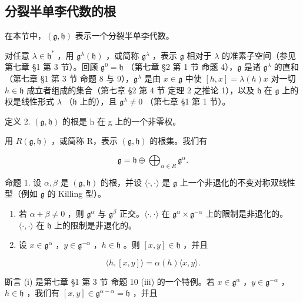 \subsection{分裂半单李代数的根}

在本节中，\((\mathfrak{g},\mathfrak{h})\) 表示一个分裂半单李代数。

对任意 \(\lambda \in \mathfrak{h}^*\) ，用 \(\mathfrak{g}^{\lambda}(\mathfrak{h})\) ，或简称 \(\mathfrak{g}^{\lambda}\) ，表示 \(\mathfrak{g}\) 相对于 \(\lambda\) 的准素子空间（参见第七章 §1 第 3 节）。回顾 \(\mathfrak{g}^{0} = \mathfrak{h}\) （第七章 §2 第 1 节 命题 4），\(\mathfrak{g}\) 是诸 \(\mathfrak{g}^{\lambda}\) 的直和（第七章 §1 第 3 节 命题 8 与 9），\(\mathfrak{g}^{\lambda}\) 是由 \(x \in \mathfrak{g}\) 中使 \([h, x] = \lambda(h)x\) 对一切 \(h \in \mathfrak{h}\) 成立者组成的集合（第七章 §2 第 4 节 定理 2 之推论 1），以及 \(\mathfrak{h}\) 在 \(\mathfrak{g}\) 上的权是线性形式 \(\lambda\) （\(\mathfrak{h}\) 上的），且 \(\mathfrak{g}^{\lambda} \neq 0\) （第七章 §1 第 1 节）。

定义 2. \((\mathfrak{g}, \mathfrak{h})\) 的根是 h 在 g 上的一个非零权。

用 \(R(\mathfrak{g},\mathfrak{h})\) ，或简称 R，表示 \((\mathfrak{g},\mathfrak{h})\) 的根集。我们有

\[
\mathfrak {g} = \mathfrak {h} \oplus \bigoplus_ {\alpha \in R} \mathfrak {g} ^ {\alpha}.
\]

命题 1. 设 \(\alpha, \beta\) 是 \((\mathfrak{g}, \mathfrak{h})\) 的根，并设 \(\langle \cdot, \cdot \rangle\) 是 \(\mathfrak{g}\) 上一个非退化的不变对称双线性型（例如 \(\mathfrak{g}\) 的 Killing 型）。

\begin{enumerate}
\def\labelenumi{(\roman{enumi})}
\item
  若 \(\alpha + \beta \neq 0\) ，则 \(\mathfrak{g}^{\alpha}\) 与 \(\mathfrak{g}^{\beta}\) 正交。\(\langle \cdot, \cdot \rangle\) 在 \(\mathfrak{g}^{\alpha} \times \mathfrak{g}^{-\alpha}\) 上的限制是非退化的。\(\langle \cdot, \cdot \rangle\) 在 \(\mathfrak{h}\) 上的限制是非退化的。
\item
  设 \(x \in \mathfrak{g}^{\alpha}\) ，\(y \in \mathfrak{g}^{-\alpha}\) ，\(h \in \mathfrak{h}\) 。则 \([x, y] \in \mathfrak{h}\) ，并且
\end{enumerate}

\[
\langle h, [ x, y ] \rangle = \alpha (h) \langle x, y \rangle .
\]

断言 (i) 是第七章 §1 第 3 节 命题 10 (iii) 的一个特例。若 \(x \in \mathfrak{g}^{\alpha}\) ，\(y \in \mathfrak{g}^{-\alpha}\) ，\(h \in \mathfrak{h}\) ，我们有 \([x, y] \in \mathfrak{g}^{\alpha - \alpha} = \mathfrak{h}\) ，并且

